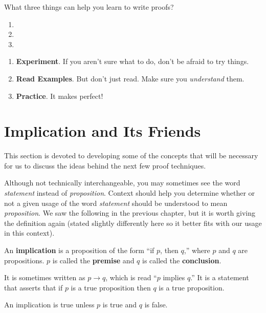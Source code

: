 \begin{ques}
What three things can help you learn to write proofs?
\begin{enumerate}
\item \blanklinefill
\item \blanklinefill
\item \blanklinefill
\end{enumerate}
\begin{answer}
\begin{enumerate}
\item {\bf Experiment}.  If you aren't sure what to do, don't be afraid to try things.
\item {\bf Read Examples}. But don't just read.  Make sure you {\em understand} them.
\item {\bf Practice}.  It makes perfect!  
\end{enumerate}
\end{answer}
\end{ques}

\newpage
\section{Implication and Its Friends}\label{section:implication}
This section is devoted to developing some of the concepts that will be necessary for
us to discuss the ideas behind the next few proof techniques.


Although not technically interchangeable, you may sometimes see the word {\em statement} instead of 
{\em proposition}.  Context should help you determine whether or not a given usage of the word {\em statement}
should be understood to mean {\em proposition}.
We saw the following in the previous chapter, but
it is worth giving the definition again
(stated slightly differently here so it better fits
with our usage in this context). 

\begin{df}
An {\bf implication} is a proposition of the form ``if $p$, then $q$,''
where $p$ and $q$ are propositions.
$p$ is called the {\bf premise} and $q$ is called the {\bf conclusion}.

It is sometimes written as $p\rightarrow q$, which is read ``$p$ implies $q$.''
It is a statement that asserts that if $p$ is a true proposition then $q$ is a true proposition.

An implication is true unless $p$ is true and $q$ is false.
\end{df}


